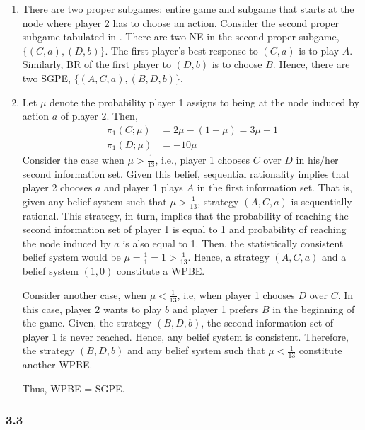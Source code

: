 \documentclass[]{article}
\begin{document}
\begin{enumerate}[label=(\roman*)]
	\item There are two proper subgames: entire game and subgame that starts at the node where player 2 has to choose an action. Consider the second proper subgame tabulated in .	There are two NE in the second proper subgame, $\{(C, a), (D, b)\}$. The first player's best response to $(C, a)$ is to play $A$. Similarly, BR of the first player to $(D, b)$ is to choose $B$. Hence, there are two SGPE, $\{(A, C, a), (B, D, b)\}$.
	
	\item 	Let $\mu$ denote the probability player 1 assigns to being at the node induced by action $a$ of player 2. Then, 
	\begin{equation}
		\begin{split}
			\pi_1(C; \mu)& = 2\mu - (1 - \mu) = 3\mu - 1 \\ \nonumber
			\pi_1(D; \mu)& = -10\mu
		\end{split}
	\end{equation}
	Consider the case when $\mu > \frac{1}{13}$, i.e., player 1 chooses $C$ over $D$ in his/her second information set. Given this belief, sequential rationality implies that player 2 chooses $a$ and player 1 plays $A$ in the first information set. That is, given any belief system such that $\mu > \frac{1}{13}$, strategy $(A, C, a)$ is sequentially rational. This strategy, in turn, implies that the probability of reaching the second information set of player 1 is equal to 1 and probability of reaching the node induced by $a$ is also equal to 1. Then, the statistically consistent belief system would be $\mu = \frac{1}{1} = 1 > \frac{1}{13}$. Hence, a strategy $(A, C, a)$ and a belief system $(1, 0)$ constitute a WPBE.
	
	Consider another case, when $\mu < \frac{1}{13}$, i.e, when player 1 chooses $D$ over $C$. In this case, player 2 wants to play $b$ and player 1 prefers $B$ in the beginning of the game. Given, the strategy $(B, D, b)$, the second information set of player 1 is never reached. Hence, any belief system is consistent. Therefore, the strategy $(B, D, b)$ and any belief system such that $\mu < \frac{1}{13}$ constitute another WPBE.
	
	Thus, WPBE = SGPE.
\end{enumerate}

\subsubsection*{3.3}
\label{ex3.3}
\end{document}
